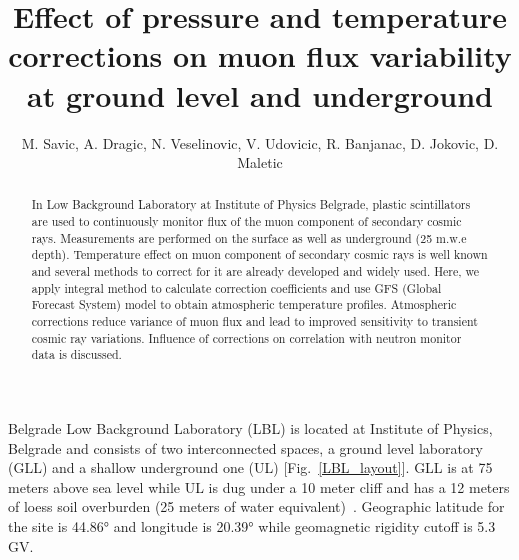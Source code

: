 \documentclass[twocolumn,twoside,slac_two]{revtex4}
\begin{document}
\title{Effect of pressure and temperature corrections on muon flux variability at ground level and underground}


%

\author{M. Savic, A. Dragic, N. Veselinovic, V. Udovicic, R. Banjanac, D. Jokovic, D. Maletic}
%

\begin{abstract}
In Low Background Laboratory at Institute of Physics Belgrade, plastic scintillators are used to continuously monitor flux of the muon component of secondary cosmic rays. Measurements are performed on the surface as well as underground (25 m.w.e depth). Temperature effect on muon component of secondary cosmic rays is well known and several methods to correct for it are already developed and widely used. Here, we apply integral method to calculate correction coefficients and use GFS (Global Forecast System) model to obtain atmospheric temperature profiles. Atmospheric corrections reduce variance of muon flux and lead to improved sensitivity to transient cosmic ray variations. Influence of corrections on correlation with neutron monitor data is discussed.
\end{abstract}

\maketitle

\thispagestyle{fancy}


Belgrade Low Background Laboratory (LBL) is located at Institute of Physics, Belgrade and consists of two interconnected spaces, a ground level laboratory (GLL) and a shallow underground one (UL) [Fig.~\ref{LBL_layout}]. GLL is at 75 meters above sea level while UL is dug under a 10 meter cliff and has a 12 meters of loess soil overburden (25 meters of water equivalent)~\cite{ref-1}. Geographic latitude for the site is 44.86° and longitude is 20.39° while geomagnetic rigidity cutoff is 5.3 GV. 
\end{document}
